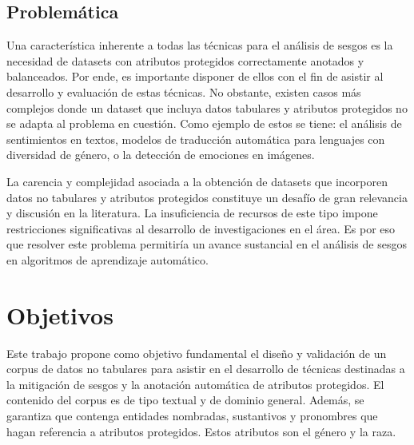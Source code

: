 
\subsection*{Problem\'atica}
Una caracter\'istica inherente a todas las t\'ecnicas para el an\'alisis de sesgos es la necesidad de datasets con 
atributos protegidos correctamente anotados y balanceados. Por ende, es importante disponer de ellos con el fin de 
asistir al desarrollo y evaluaci\'on de estas t\'ecnicas. No obstante, existen casos m\'as complejos donde un dataset que incluya 
datos tabulares y atributos protegidos no se adapta al problema en cuesti\'on. Como ejemplo de estos se tiene:  
el an\'alisis de sentimientos en textos, modelos de traducci\'on autom\'atica para lenguajes con diversidad 
de g\'enero, o la detecci\'on de emociones en im\'agenes.

La carencia y complejidad asociada a la obtenci\'on de datasets que incorporen datos no tabulares y atributos protegidos constituye un 
desaf\'io de gran relevancia y discusi\'on en la literatura. La insuficiencia de recursos de este tipo impone restricciones 
significativas al desarrollo de investigaciones en el \'area. Es por eso que resolver este problema permitir\'ia un avance sustancial 
en el an\'alisis de sesgos en algoritmos de aprendizaje autom\'atico.

\section*{Objetivos}
Este trabajo propone como objetivo fundamental el dise\~no y validaci\'on de un corpus de datos no tabulares para
asistir en el desarrollo de t\'ecnicas destinadas a la mitigaci\'on de sesgos y la anotaci\'on autom\'atica de atributos protegidos. El contenido del corpus
es de tipo textual y de dominio general. Adem\'as, se garantiza que contenga entidades nombradas, sustantivos y pronombres
que hagan referencia a atributos protegidos. Estos atributos son el g\'enero y la raza.

